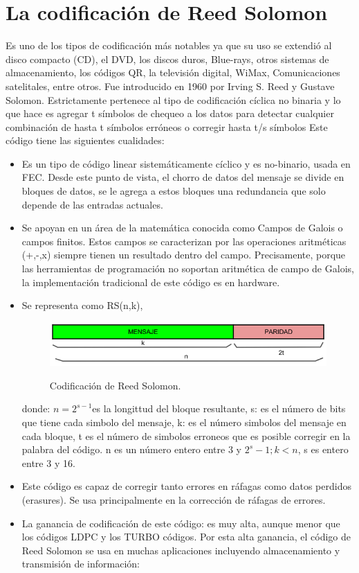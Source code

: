 \section{La codificación de Reed Solomon}

Es uno de los tipos de codificación más notables ya que su uso se extendió al disco compacto (CD), el DVD, los discos duros, Blue-rays, otros sistemas de almacenamiento, los códigos QR, la televisión digital, WiMax, Comunicaciones satelitales, entre otros. Fue introducido en 1960 por Irving S. Reed y Gustave Solomon. 
Estrictamente pertenece al tipo de codificación cíclica no binaria y lo que hace es agregar t símbolos de chequeo a los datos para detectar cualquier combinación de hasta t símbolos erróneos o corregir hasta t/s símbolos
Este código tiene las siguientes cualidades:
\begin{itemize}
 \item Es un tipo de código linear sistemáticamente cíclico y es no-binario, usada en FEC. Desde este punto de vista, el chorro de datos del mensaje se divide en bloques de datos, se le agrega a estos bloques una redundancia que solo depende de las entradas actuales. 
 \item Se apoyan en un área de la matemática conocida como Campos de Galois o campos finitos. Estos campos se caracterizan por las operaciones aritméticas (+,-,x) siempre tienen un resultado dentro del campo. Precisamente, porque las herramientas de programación no soportan aritmética de campo de Galois, la implementación tradicional de este código es en hardware.
 \item Se representa como RS(n,k), 
 
 \begin{figure}[h!]
	\captionsetup{justification = raggedright, singlelinecheck = false}
	\caption{Codificación de Reed Solomon.} 
	\centering
	\includegraphics[scale=1]{Imagenes/RS.png}
	\label{fig:RS}
\end{figure}

donde: $n= 2^{s-1}$es la longittud del bloque resultante, s: es el número de bits que tiene cada simbolo del mensaje, k: es el número simbolos del mensaje en cada bloque, t es el número de simbolos erroneos que es posible corregir en la palabra del código. n es un número entero entre 3 y $2^{s}-1; k<n$, s es entero entre 3 y 16.
 \item Este código es capaz de corregir tanto errores en ráfagas como datos perdidos (erasures). Se usa principalmente en la corrección de ráfagas de errores.
 \item La ganancia de codificación de este código: es muy alta, aunque menor que los códigos LDPC y los TURBO códigos. Por esta alta ganancia, el código de Reed Solomon se usa en muchas aplicaciones incluyendo almacenamiento y transmisión de información:
 

\end{itemize}
